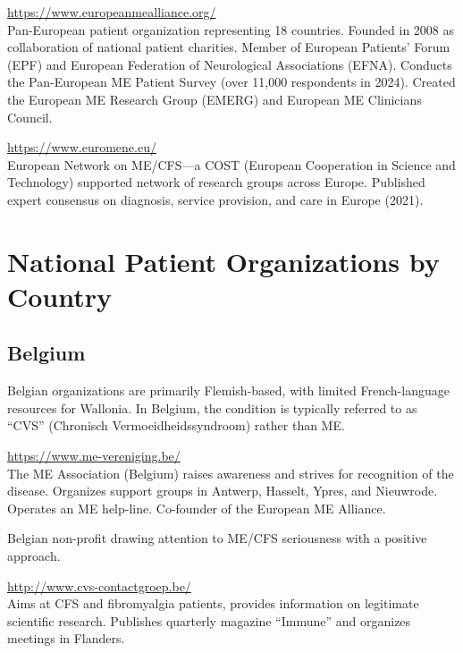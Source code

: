 \begin{description}[style=nextline]
\item[European ME Alliance (EMEA)] \hfill \url{https://www.europeanmealliance.org/}\\
Pan-European patient organization representing 18 countries. Founded in 2008 as collaboration of national patient charities. Member of European Patients' Forum (EPF) and European Federation of Neurological Associations (EFNA). Conducts the Pan-European ME Patient Survey (over 11,000 respondents in 2024). Created the European ME Research Group (EMERG) and European ME Clinicians Council.

\item[EUROMENE] \hfill \url{https://www.euromene.eu/}\\
European Network on ME/CFS---a COST (European Cooperation in Science and Technology) supported network of research groups across Europe. Published expert consensus on diagnosis, service provision, and care in Europe (2021).
\end{description}

\section{National Patient Organizations by Country}
\label{sec:national-orgs}

\subsection{Belgium}
\label{subsec:belgium-orgs}

\begin{remark}
Belgian organizations are primarily Flemish-based, with limited French-language resources for Wallonia. In Belgium, the condition is typically referred to as ``CVS'' (Chronisch Vermoeidheidssyndroom) rather than ME.
\end{remark}

\begin{description}[style=nextline]
\item[ME-Vereniging vzw] \hfill \url{https://www.me-vereniging.be/}\\
The ME Association (Belgium) raises awareness and strives for recognition of the disease. Organizes support groups in Antwerp, Hasselt, Ypres, and Nieuwrode. Operates an ME help-line. Co-founder of the European ME Alliance.

\item[12ME] \hfill Belgian non-profit drawing attention to ME/CFS seriousness with a positive approach.

\item[CVS contact groep vzw] \hfill \url{http://www.cvs-contactgroep.be/}\\
Aims at CFS and fibromyalgia patients, provides information on legitimate scientific research. Publishes quarterly magazine ``Immune'' and organizes meetings in Flanders.
\end{description}

